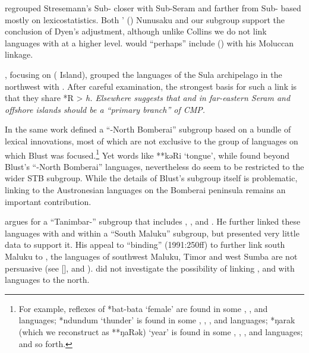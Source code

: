 \citet{Dyen1978b} regrouped Stresemann’s Sub- closer with
Sub-Seram and farther from Sub- based mostly on lexicostatistics.
Both \citeauthor{Collins1983}’ (\citeyear{Collins1983}) Nunusaku
and our  subgroup support the conclusion of
Dyen’s adjustment, although unlike Collins we do not link  languages
with  at a higher level.
\citet[45]{Dyen1965} would “perhaps” include  ()
with his Moluccan linkage.

\citet{Blust1981}, focusing on  ( Island),
grouped the languages of the Sula archipelago in the northwest with .
After careful examination, the strongest basis for such a link
is that they share *R > \it{h}.
Elsewhere \citet[279]{Blust1993} suggests that 
and  in far-eastern Seram
and offshore islands should be a “primary branch” of CMP.

In the same work \citet[276ff]{Blust1993} defined a “-North
Bomberai” subgroup based on a bundle of lexical innovations,
most of which are not exclusive to the group of languages on
which Blust was focused.\footnote{
For example,
reflexes of *bat-bata ‘female’ are found in some ,
, and  languages; *ndundum ‘thunder’
is found in some ,
, , and  languages;
*ŋarak (which we reconstruct as **ŋaRək) ‘year’ is found in some
, , , and 
languages; and so forth.}
Yet words like **kəRi ‘tongue’,
while found beyond Blust’s “-North Bomberai” languages,
nevertheless do seem to be restricted to the wider STB  subgroup.
While the details of Blust’s subgroup itself is problematic,
linking  to the Austronesian languages on the Bomberai
peninsula remains an important contribution.

\citet{Mills1991} argues for a “Tanimbar-” subgroup that includes
, , and .
He further linked these languages with 
and  within a “South Maluku” subgroup,
but presented very little data to support it.
His appeal to “binding” (1991:250ff) to further link south
Maluku to , the languages of southwest Maluku,
Timor and west Sumba are not persuasive
(see \citeauthor{Blust1993} [\citeyear[276]{Blust1993}], and ).
\citet{Mills1991} did not investigate the possibility of linking
,  and  with languages to the north.

